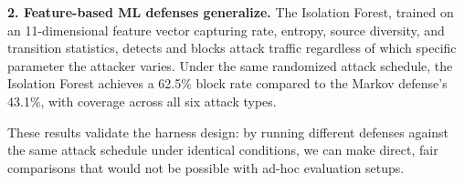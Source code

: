 \textbf{2. Feature-based ML defenses generalize.}  The Isolation Forest,
trained on an 11-dimensional feature vector capturing rate, entropy,
source diversity, and transition statistics, detects and blocks attack
traffic regardless of which specific parameter the attacker varies.
Under the same randomized attack schedule, the Isolation Forest achieves
a 62.5\% block rate compared to the Markov defense's 43.1\%, with
coverage across all six attack types.

These results validate the harness design: by running different defenses
against the same attack schedule under identical conditions, we can
make direct, fair comparisons that would not be possible with ad-hoc
evaluation setups.

